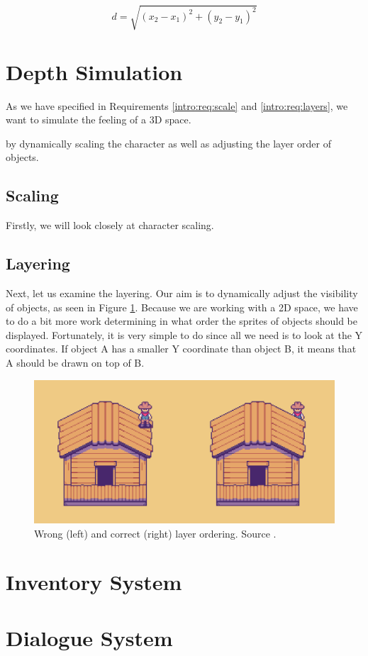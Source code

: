 \[
d = \sqrt{(x_2 - x_1)^2 + (y_2 - y_1)^2}
\]

\section{Depth Simulation}
As we have specified in Requirements \ref{intro:req:scale} and \ref{intro:req:layers}, we want to simulate the feeling of a 3D space.

by dynamically scaling the character as well as adjusting the layer order of objects.

\subsection{Scaling}
Firstly, we will look closely at character scaling. 

\subsection{Layering}
Next, let us examine the layering. Our aim is to dynamically adjust the visibility of objects, as seen in Figure \ref{fig:Layers}. Because we are working with a 2D space, we have to do a bit more work determining in what order the sprites of objects should be displayed. Fortunately, it is very simple to do since all we need is to look at the Y coordinates. If object A has a smaller Y coordinate than object B, it means that A should be drawn on top of B. 


\begin{figure}[H]
\centering
\includegraphics[width=.8\linewidth]{img/layers.png}
\caption{Wrong (left) and correct (right) layer ordering. Source \cite{Piotr}.}
\label{fig:Layers}
\end{figure}

\section{Inventory System}


\section{Dialogue System}


